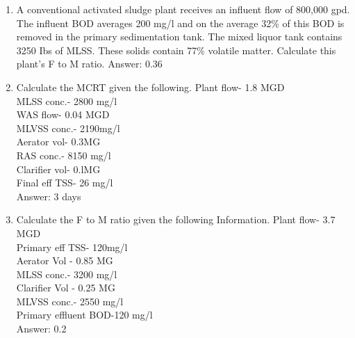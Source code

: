 \begin{enumerate}
\item A conventional activated sludge plant receives an influent flow of 800,000 gpd. The influent BOD averages 200 mg/l and on the average 32\% of this BOD is removed in the primary sedimentation tank. The mixed liquor tank contains 3250 Ibs of MLSS. These solids contain 77\% volatile matter. Calculate this plant's F to M ratio.  Answer:  0.36

\item Calculate the MCRT given the following.
Plant flow- 1.8 MGD\\ 		MLSS conc.- 2800 mg/l\\
WAS flow- 0.04 MGD \\		MLVSS conc.- 2190mg/l\\
Aerator vol- 0.3MG\\	RAS conc.- 8150 mg/l\\
Clarifier vol- 0.lMG\\ 		Final eff TSS- 26 mg/l\\
Answer: 3 days

\item Calculate the F to M ratio given the following Information.
Plant flow- 3.7 MGD\\		Primary eff TSS- 120mg/l\\
Aerator Vol - 0.85 MG\\ 	MLSS conc.- 3200 mg/l\\
Clarifier Vol - 0.25 MG \\	MLVSS conc.- 2550 mg/l\\
Primary effluent BOD-120 mg/l\\
Answer:  0.2\\


\end{enumerate}
